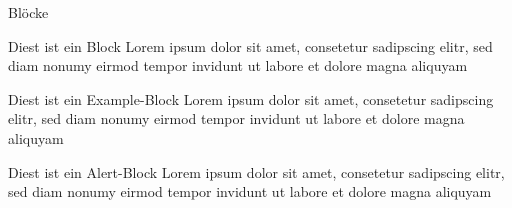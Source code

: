 \documentclass{beamer}
\begin{document}
\begin{frame}{Blöcke}
    \begin{block}{Diest ist ein Block}
    Lorem ipsum dolor sit amet, consetetur sadipscing elitr, sed diam
    nonumy eirmod tempor invidunt ut labore et dolore magna aliquyam
  \end{block}
  \begin{exampleblock}{Diest ist ein Example-Block}
    Lorem ipsum dolor sit amet, consetetur sadipscing elitr, sed diam
    nonumy eirmod tempor invidunt ut labore et dolore magna aliquyam
  \end{exampleblock}
  \begin{alertblock}{Diest ist ein Alert-Block}
    Lorem ipsum dolor sit amet, consetetur sadipscing elitr, sed diam
    nonumy eirmod tempor invidunt ut labore et dolore magna aliquyam
  \end{alertblock}
\end{frame}
\end{document}
